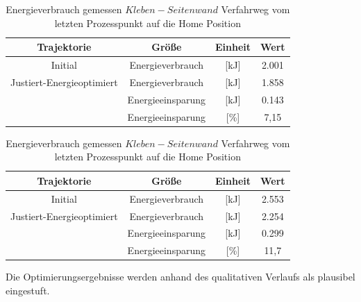\begin{table}[tbph]
	\centering
	\caption{Energieverbrauch simuliert $Kleben-Seitenwand$ Verfahrweg vom letzten Prozesspunkt auf die  Home Position}
	\label{tab:energieverbrauch-simuliert}
	\begin{tabular}{|c|c|c|c|}
		\hline
		Trajektorie & Größe & Einheit & Wert \\
		\hline
		Initial & Energieverbrauch & [kJ] &2.001  \\
		\hline
		Justiert-Energieoptimiert & Energieverbrauch & [kJ] &1.858  \\
		\hline
		& Energieeinsparung & [kJ] &0.143  \\
		\hline
		& Energieeinsparung & [\%] &7,15  \\
		\hline
	\end{tabular}
	\centering
	\caption{Energieverbrauch gemessen $Kleben-Seitenwand$ Verfahrweg vom letzten Prozesspunkt auf die  Home Position}
	\label{tab:energieverbrauch-gemessen}
	\begin{tabular}{|c|c|c|c|}
		\hline
		Trajektorie & Größe & Einheit & Wert \\
		\hline
		Initial & Energieverbrauch & [kJ] &2.553  \\
		\hline
		Justiert-Energieoptimiert & Energieverbrauch & [kJ] &2.254 \\
		\hline
		& Energieeinsparung & [kJ] &0.299  \\
		\hline
		& Energieeinsparung & [\%] &11,7 \\
		\hline
	\end{tabular}
\end{table}
Die Optimierungsergebnisse werden anhand des qualitativen Verlaufs als plausibel eingestuft.
